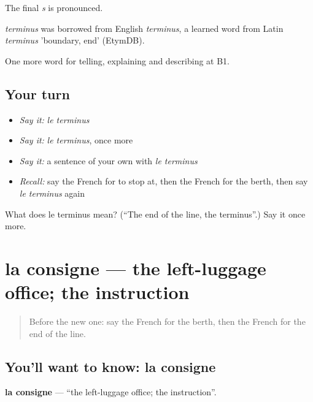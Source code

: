 The final \emph{s} is pronounced.

\begin{cousinweb}
\emph{terminus} was borrowed from English \emph{terminus}, a learned word from Latin \emph{terminus} 'boundary, end' (EtymDB).
\end{cousinweb}

\begin{grammarlens}[title={What you've built}]
One more word for telling, explaining and describing at B1.
\end{grammarlens}

\subsection*{Your turn}
\begin{itemize}
\raggedright
  \item \emph{Say it:} \emph{le terminus}
  \item \emph{Say it:} \emph{le terminus}, once more
  \item \emph{Say it:} a sentence of your own with \emph{le terminus}
  \item \emph{Recall:} say the French for to stop at, then the French for the berth, then say \emph{le terminus} again
\end{itemize}

\begin{tcolorbox}[breakable,colback=teal!4,colframe=teal!35!black,title={Before you move on}]
What does le terminus mean? (\textquotedblleft{}The end of the line, the terminus\textquotedblright{}.) Say it once more.
\end{tcolorbox}
\section[la consigne]{la consigne — the left-luggage office; the instruction}

\label{lesson:FR-C414-consigne}



\begin{quote}
Before the new one: say the French for the berth, then the French for the end of the line.
\end{quote}

\subsection*{You'll want to know: la consigne}
\textbf{la consigne} — \textquotedblleft{}the left-luggage office; the instruction\textquotedblright{}.

